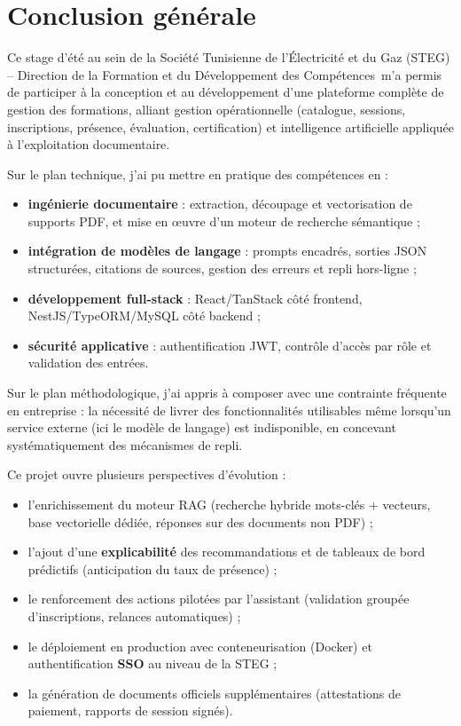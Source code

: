 \documentclass[12pt,a4paper,oneside,openany]{report}
\newcommand{\organisme}{Société Tunisienne de l'Électricité et du Gaz (STEG) -- Direction de la Formation et du Développement des Compétences}
\begin{document}
\chapter*{Conclusion générale}

Ce stage d'été au sein de la \organisme\ m'a permis de participer à la conception et au développement d'une plateforme complète de gestion des formations, alliant gestion opérationnelle (catalogue, sessions, inscriptions, présence, évaluation, certification) et intelligence artificielle appliquée à l'exploitation documentaire.

Sur le plan technique, j'ai pu mettre en pratique des compétences en :
\begin{itemize}
    \item \textbf{ingénierie documentaire} : extraction, découpage et vectorisation de supports PDF, et mise en œuvre d'un moteur de recherche sémantique ;
    \item \textbf{intégration de modèles de langage} : prompts encadrés, sorties JSON structurées, citations de sources, gestion des erreurs et repli hors-ligne ;
    \item \textbf{développement full-stack} : React/TanStack côté frontend, NestJS/TypeORM/MySQL côté backend ;
    \item \textbf{sécurité applicative} : authentification JWT, contrôle d'accès par rôle et validation des entrées.
\end{itemize}

Sur le plan méthodologique, j'ai appris à composer avec une contrainte fréquente en entreprise : la nécessité de livrer des fonctionnalités utilisables même lorsqu'un service externe (ici le modèle de langage) est indisponible, en concevant systématiquement des mécanismes de repli.

Ce projet ouvre plusieurs perspectives d'évolution :
\begin{itemize}
    \item l'enrichissement du moteur RAG (recherche hybride mots-clés + vecteurs, base vectorielle dédiée, réponses sur des documents non PDF) ;
    \item l'ajout d'une \textbf{explicabilité} des recommandations et de tableaux de bord prédictifs (anticipation du taux de présence) ;
    \item le renforcement des actions pilotées par l'assistant (validation groupée d'inscriptions, relances automatiques) ;
    \item le déploiement en production avec conteneurisation (Docker) et authentification \textbf{SSO} au niveau de la STEG ;
    \item la génération de documents officiels supplémentaires (attestations de paiement, rapports de session signés).
\end{itemize}
\end{document}
